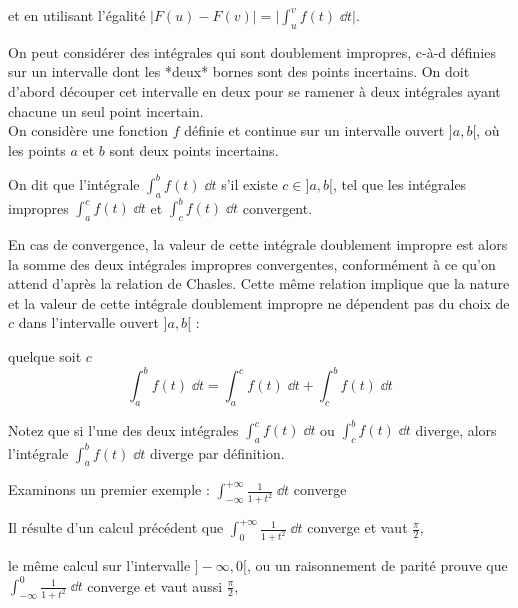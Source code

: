 \change

et en utilisant l'égalité 
$\big|F(u)-F(v)\big|=\big|\int_u^vf(t)\; \dd t\big|$.



\diapo

On peut considérer des intégrales qui sont doublement impropres, 
c-à-d définies sur un intervalle dont les *deux* bornes sont des points 
incertains. On doit d'abord découper cet 
intervalle en deux pour se ramener à deux  intégrales ayant chacune 
un seul point incertain. \\

On considère une fonction $f$ définie et continue sur un 
intervalle ouvert $]a,b[$, où les points $a$ et $b$ sont deux points incertains.

\change

On dit que l'intégrale $\int_a^b f(t)\;\dd t$  
s'il existe
$c \in ]a,b[$, 
tel que les  intégrales
impropres $\int_a^c f(t)\;\dd t$ et $\int_c^b f(t)\;\dd t$ convergent.

\change

En cas de convergence, la valeur de cette intégrale doublement impropre 
est alors la somme des 
deux intégrales impropres convergentes, conformément à ce qu'on attend 
d'après la relation de Chasles. Cette même relation implique que la nature 
et la valeur de cette intégrale doublement impropre ne dépendent pas du 
choix de $c$ dans l'intervalle ouvert $]a,b[$ :

quelque soit $c$
$$\int_a^b f(t)\;\dd t = \int_a^c f(t)\;\dd t+\int_c^b f(t)\;\dd t$$


Notez que si l'une des deux intégrales $\int_a^c f(t)\;\dd t$ ou 
$\int_c^b f(t)\;\dd t$ diverge, alors l'intégrale 
$\int_a^b f(t)\;\dd t$ diverge par définition.



\diapo

Examinons un premier exemple : 
$\int_{-\infty}^{+\infty} \frac{1}{1+t^2}\;\dd t$ 
converge 

\change

Il résulte d'un calcul précédent que 
$ \int_0^{+\infty} \frac{1}{1+t^2}\;\dd t$ converge et vaut 
$\frac{\pi}{2}$, 

\change
le même calcul sur l'intervalle $]-\infty,0[$, 
ou un raisonnement de parité prouve
que $\int_{-\infty}^{0} \frac{1}{1+t^2}\;\dd t$
converge et vaut aussi $\frac{\pi}{2}$, 

